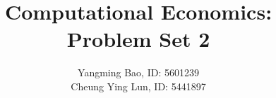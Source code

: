 \documentclass[11pt]{article}
\title{Computational Economics: Problem Set 2}
\date{}
\author{Yangming Bao, ID: 5601239\\Cheung Ying Lun, ID: 5441897}
\begin{document}
\maketitle





%

\pagebreak
\appendix
%
\end{document}
